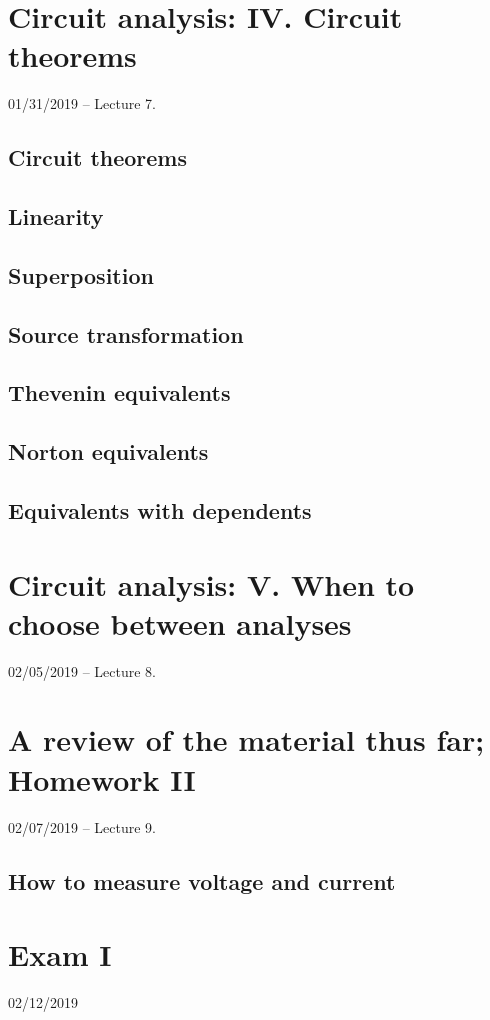 \documentclass[11pt]{book}
\begin{document}
\chapter{Circuit analysis: IV. Circuit theorems}
01/31/2019 – Lecture 7. 
\section{Circuit theorems}
\section{Linearity}
\section{Superposition}
\section{Source transformation}
\section{Thevenin equivalents}
\section{Norton equivalents}
\section{Equivalents with dependents}



\chapter{Circuit analysis: V. When to choose between analyses}
02/05/2019 – Lecture 8. 

\chapter{A review of the material thus far; Homework II}
02/07/2019 – Lecture 9. 

\section{How to measure voltage and current}

\chapter*{Exam I}
02/12/2019
\end{document}
